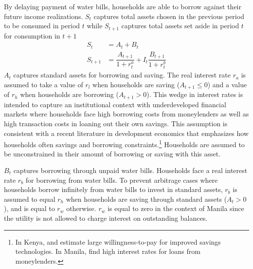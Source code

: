\documentclass[12pt]{article}
\begin{document}
By delaying payment of water bills, households are able to borrow against their future income realizations.  $S_t$ captures total assets chosen in the previous period to be consumed in period $t$ while $S_{t+1}$ captures total assets set aside in period $t$ for consumption in $t+1$ %
\begin{align}
S_t &= A_t + B_t \\
S_{t+1} &=  \dfrac{A_{t+1}}{1+r^{a}_{t}}  + I_t \dfrac{B_{t+1}}{1+r^{b}_{t}} 
\end{align}
$A_t$ captures standard assets for borrowing and saving.  The real interest rate $r_a$ is assumed to take a value of $r_l$ when households are saving ($A_{t+1} \leq 0$) and a value of $r_h$ when households are borrowing ($A_{t+1} > 0$).  This wedge in interest rates is intended to capture an institutional context with underdeveloped financial markets where households face high borrowing costs from moneylenders as well as high transaction costs in loaning out their own savings.  This assumption is consistent with a recent literature in development economics that emphasizes how households often savings and borrowing constraints.\footnote{In Kenya, \cite{dupas2013savings} and \cite{dupas2013don} estimate large willingness-to-pay for improved savings technologies.  In Manila, \cite{karlan2009expanding} find high  interest rates for loans from moneylenders.}  Households are assumed to be unconstrained in their amount of borrowing or saving with this asset.  %

$B_t$ captures borrowing through unpaid water bills.  Households face a real interest rate $r_b$ for borrowing from water bills.  To prevent arbitrage cases where households borrow infinitely from water bills to invest in standard assets, $r_b$ is assumed to equal $r_h$ when households are saving through standard assets ($A_t>0$), and is equal to $r_w$ otherwise.  $r_w$ is equal to zero in the context of Manila since the utility is not allowed to charge interest on outstanding balances.%
\end{document}
